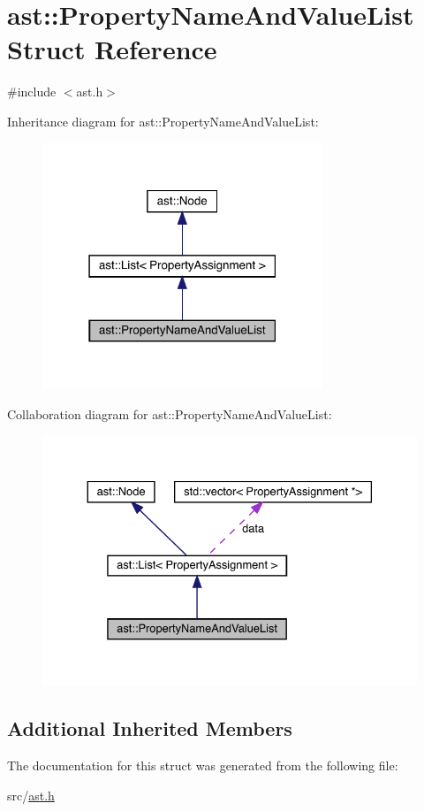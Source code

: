\hypertarget{structast_1_1_property_name_and_value_list}{}\section{ast\+:\+:Property\+Name\+And\+Value\+List Struct Reference}
\label{structast_1_1_property_name_and_value_list}


{\ttfamily \#include $<$ast.\+h$>$}



Inheritance diagram for ast\+:\+:Property\+Name\+And\+Value\+List\+:\nopagebreak
\begin{figure}[H]
\begin{center}
\leavevmode
\includegraphics[width=238pt]{structast_1_1_property_name_and_value_list__inherit__graph}
\end{center}
\end{figure}


Collaboration diagram for ast\+:\+:Property\+Name\+And\+Value\+List\+:\nopagebreak
\begin{figure}[H]
\begin{center}
\leavevmode
\includegraphics[width=330pt]{structast_1_1_property_name_and_value_list__coll__graph}
\end{center}
\end{figure}
\subsection*{Additional Inherited Members}


The documentation for this struct was generated from the following file\+:\begin{DoxyCompactItemize}
\item 
src/\hyperlink{ast_8h}{ast.\+h}\end{DoxyCompactItemize}
